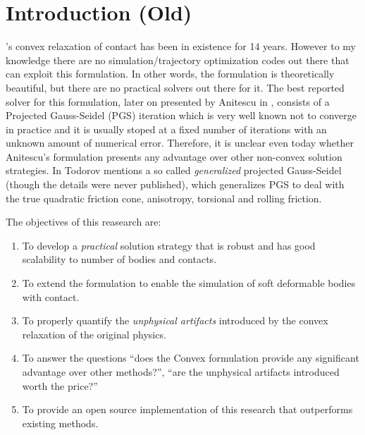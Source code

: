 




\section{Introduction (Old)}

's convex relaxation of contact
\cite{bib:anitescu2006} has been in existence for 14 years. However to my
knowledge there are no simulation/trajectory optimization codes out there that
can exploit this formulation. In other words, the formulation is theoretically
beautiful, but there are no practical solvers out there for it. The best
reported solver for this formulation, later on presented by Anitescu in
\cite{bib:anitescu2010, bib:tasora2011}, consists of a Projected Gauss-Seidel
(PGS) iteration which is very well known not to converge in practice and it is
usually stoped at a fixed number of iterations with an unknown amount of
numerical error. Therefore, it is unclear even today whether Anitescu's
formulation presents any advantage over other non-convex solution strategies. In
\cite{bib:todorov2014} Todorov mentions a so called \textit{generalized}
projected Gauss-Seidel (though the details were never published), which
generalizes PGS to deal with the true quadratic friction cone, anisotropy,
torsional and rolling friction.

The objectives of this reasearch are:
\begin{enumerate}
	\item To develop a \textit{practical} solution strategy that is robust and
	has good scalability to number of bodies and contacts.
	\item To extend the formulation to enable the simulation of soft deformable
	bodies with contact.
	\item To properly quantify the \textit{unphysical artifacts} introduced by
	the convex relaxation of the original physics.
	\item To answer the questions ``does the Convex formulation provide any
	significant advantage over other methods?'', ``are the unphysical artifacts
	introduced worth the price?''
	\item To provide an open source implementation of this research that
	outperforms existing methods.
\end{enumerate}

